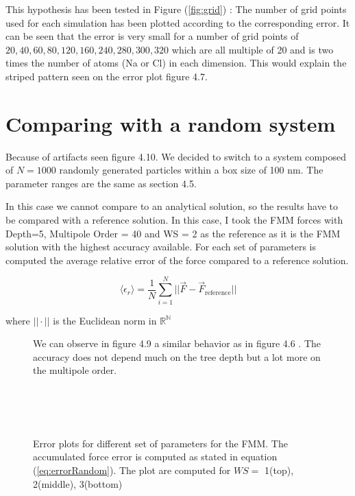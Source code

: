 \documentclass[10pt,twoside,a4paper]{report}
\begin{document}
   This hypothesis has been tested in Figure (\ref{fig:grid}) : The number of grid points used for each simulation has been plotted according to the corresponding error. It can be seen that the error is very small for a number of grid points of $20,40,60,80,120,160,240,280,300,320$ which are all multiple of 20 and is two times the number of atoms (Na or Cl) in each dimension. This would explain the striped pattern seen on the error plot figure 4.7.


\section{Comparing with a random system}

	Because of artifacts seen figure 4.10. We decided to switch to a system composed of $N=1000$ randomly generated particles within a box size of 100 nm. The parameter ranges are the same as section 4.5.

	In this case we cannot compare to an analytical solution, so the results have to be compared with a reference solution. In this case, I took the FMM forces with Depth=5, Multipole Order = 40 and WS = 2 as the reference as it is the FMM solution with the highest accuracy available. For each set of parameters is computed the average relative error of the force compared to a reference solution.
	
	\begin{equation}
	 \langle \epsilon_r \rangle	= \frac{1}{N} \sum\limits_{i=1}^N|| \vec{F} - \vec{F}_{\text{reference}} ||
	\label{eq:errorRandom}	
	\end{equation}
	

	where $||\cdot||$ is the Euclidean norm in $\mathbb{R^N}$

		    \begin{figure}[H]
		    
We can observe in figure 4.9 a similar behavior as in figure 4.6 . The accuracy does not depend much on the tree depth but a lot more on the multipole order.		    
		    
  \label{fig:FMM_contour}
    \centering  
 \\    
  \\   
\\    
  
  
    \caption{Error plots for different set of parameters for the FMM. The accumulated force error is computed as stated in equation (\ref{eq:errorRandom}). The plot are computed for $WS =$ 1(top), 2(middle), 3(bottom)}    
   \end{figure}  
\end{document}
